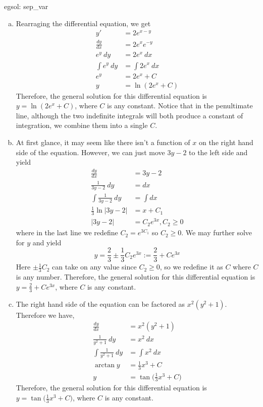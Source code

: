 \begin{egsol}[]{egsol: sep_var}
    \begin{enumerate}[a)]
        \item Rearraging the differential equation, we get
        \begin{align*}
            y' &= 2e^{x-y}\\
            \frac{dy}{dx} &= 2e^xe^{-y}\\
            e^y~dy &= 2e^x~dx\\
            \int e^y~dy &= \int 2e^x~dx\\
            e^y &= 2e^x + C\\
            y &= \ln(2e^x + C)
        \end{align*}
        Therefore, the general solution for this differential equation is $y = \ln(2e^x + C)$, where $C$ is any constant.  Notice that in the penultimate line, although the two indefinite integrals will both produce a constant of integration, we combine them into a single $C$. 
        \item At first glance, it may seem like there isn't a function of $x$ on the right hand side of the equation.  However, we can just move $3y-2$ to the left side and yield
        \begin{align*}
            \frac{dy}{dx} &= 3y-2\\
            \frac{1}{3y-2}~dy &= dx\\
            \int \frac{1}{3y-2}~dy &= \int dx\\
            \frac{1}{3}\ln|3y-2| &= x + C_1\\
            |3y-2| &= C_2e^{3x}, C_2 \ge 0
        \end{align*}
        where in the last line we redefine $C_2 = e^{3C_1}$ so $C_2 \ge 0$.  We may further solve for $y$ and yield
        \[y = \frac{2}{3} \pm \frac{1}{3}C_2e^{3x} := \frac{2}{3} + Ce^{3x}\]
        Here $\pm \frac{1}{3}C_2$ can take on any value since $C_2 \ge 0$, so we redefine it as $C$ where $C$ is any number.  Therefore, the general solution for this differential equation is $y = \frac{2}{3} + Ce^{3x}$, where $C$ is any constant.
        \item The right hand side of the equation can be factored as $x^2(y^2+1)$.  Therefore we have,
        \begin{align*}
            \frac{dy}{dx} &= x^2(y^2+1)\\
            \frac{1}{y^2 + 1}~dy &= x^2~dx\\
            \int \frac{1}{y^2 + 1}~dy &= \int x^2~dx\\
            \arctan y &= \frac{1}{3}x^3 + C\\
            y &= \tan \Big(\frac{1}{3}x^3 + C\Big)
        \end{align*}
        Therefore, the general solution for this differential equation is $y = \tan\big(\frac{1}{3}x^3 + C\big)$, where $C$ is any constant.
    \end{enumerate}
\end{egsol}

